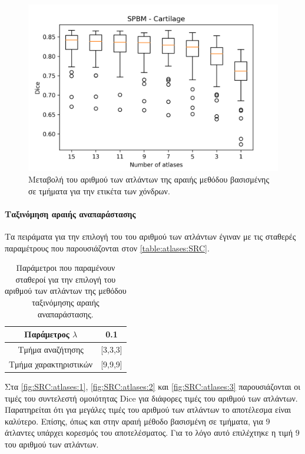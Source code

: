 \documentclass[a4paper,12pt]{article}
\newcommand{\paragraphLine}[1]{\paragraph{#1}\mbox{}}
\begin{document}
\begin{figure}[H]
    \centering
    \includegraphics[width=0.85\linewidth]{SPBM_Number_of_atlases_Cartilage_plot.png}
    \caption{Μεταβολή του αριθμού των ατλάντων της αραιής μεθόδου βασισμένης σε
             τμήματα για την ετικέτα των χόνδρων.}
    \label{fig:SPBM:atlases:3}
\end{figure}

\paragraphLine{Ταξινόμηση αραιής αναπαράστασης}

Τα πειράματα για την επιλογή του του αριθμού των ατλάντων έγιναν με τις σταθερές
παραμέτρους που παρουσιάζονται στον \autoref{table:atlases:SRC}.

\begin{table}[h!]
    \centering
    \begin{tabular}{|c|c|} 
        \hline
        Παράμετρος $\lambda$ & 0.1 \\ 
        \hline
        Τμήμα αναζήτησης & [3,3,3] \\ 
        \hline
        Τμήμα χαρακτηριστικών & [9,9,9] \\ 
        \hline
    \end{tabular}
    \caption{Παράμετροι που παραμένουν σταθεροί για την επιλογή του αριθμού των
             ατλάντων της μεθόδου ταξινόμησης αραιής αναπαράστασης.}
    \label{table:atlases:SRC}
\end{table}

Στα \autoref{fig:SRC:atlases:1}, \autoref{fig:SRC:atlases:2} και
\autoref{fig:SRC:atlases:3} παρουσιάζονται οι τιμές του συντελεστή ομοιότητας
Dice για διάφορες τιμές του αριθμού των ατλάντων. Παρατηρείται ότι για μεγάλες
τιμές του αριθμού των ατλάντων το αποτέλεσμα είναι καλύτερο. Επίσης, όπως και
στην αραιή μέθοδο βασισμένη σε τμήματα, για $9$ άτλαντες υπάρχει κορεσμός του
αποτελέσματος. Για το λόγο αυτό επιλέχτηκε η τιμή $9$ του αριθμού των ατλάντων.
\end{document}
